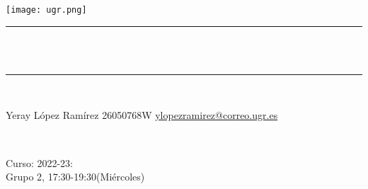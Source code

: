 \begin{titlepage}
	\centering
	\vspace*{0.5 cm}
	\texttt{[image: ugr.png]}\\[1.0 cm]
	\rule{\linewidth}{0.2 mm} \\[0.4 cm]
	{ \huge \bfseries \thetitle}\\
	\rule{\linewidth}{0.2 mm} \\[1.5 cm]
	
	\begin{minipage}{0.5\textwidth}
		\begin{flushleft} \large
		Yeray López Ramírez 26050768W
		\href{ylopezramirez@correo.ugr.es}{ylopezramirez@correo.ugr.es}
		
		\end{flushleft}
	\end{minipage}~
	\begin{minipage}{0.5\textwidth}
		\begin{flushright} \large
			Curso: 2022-23: \\
				Grupo 2, 17:30-19:30(Miércoles)                 
		\end{flushright}
	\end{minipage}\\[1 cm]
	
	{\small \thedate}\\[1 cm]
	
	\vfill
	
\end{titlepage}